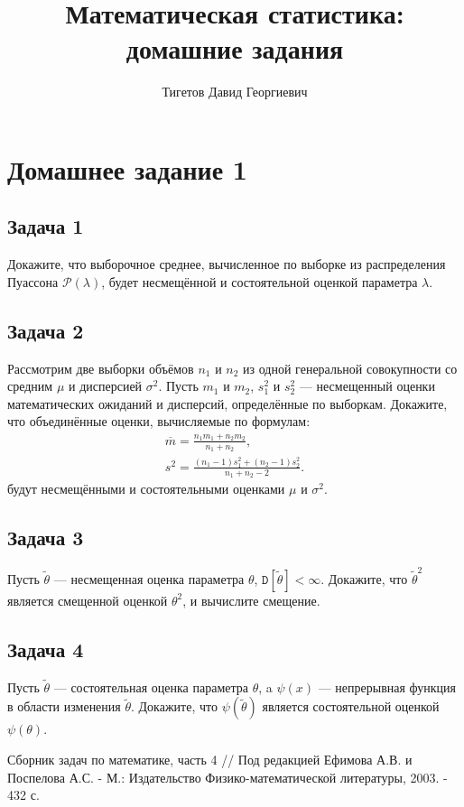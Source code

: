 \documentclass[a4paper,12pt]{article}
\newcommand{\variance}[1]{\mathtt{D} \left[ #1 \right]}
\begin{document}
\title{Математическая статистика: домашние задания}
\author{Тигетов Давид Георгиевич}
\maketitle

\section*{Домашнее задание 1}

\subsection*{Задача 1 \cite[108]{Efimov}}

Докажите, что выборочное среднее, вычисленное по выборке из распределения Пуассона $\mathcal{P}(\lambda)$, будет несмещённой и состоятельной оценкой
параметра $\lambda$.

\subsection*{Задача 2 \cite[103]{Efimov}}

Рассмотрим две выборки объёмов $n_1$ и $n_2$ из одной генеральной совокупности со средним $\mu$ и дисперсией $\sigma^2$.
Пусть $m_1$ и $m_2$, $s_1^2$ и $s_2^2$ --- несмещенный оценки математических ожиданий и дисперсий, определённые по выборкам. Докажите, что
объединённые оценки, вычисляемые по формулам:
\begin{gather*}
    \overline{m} = \frac{n_1 m_1 + n_2 m_2}{n_1 + n_2} , \\
    s^2 = \frac{(n_1 - 1) s_1^2 + (n_2 - 1) s_2^2}{n_1 + n_2 - 2} .
\end{gather*}
будут несмещёнными и состоятельными оценками $\mu$ и $\sigma^2$.

\subsection*{Задача 3 \cite[107]{Efimov}}

Пусть $\widetilde{\theta}$ --- несмещенная оценка параметра $\theta$, $\variance{\widetilde{\theta}} < \infty$. Докажите, что
$\widetilde{\theta}^2$ является смещенной оценкой $\theta^2$, и вычислите смещение.

\subsection*{Задача 4 \cite[110]{Efimov}}

Пусть $\widetilde{\theta}$ --- состоятельная оценка параметра $\theta$, a $\psi(x)$ --- непрерывная функция в области изменения $\widetilde{\theta}$.
Докажите, что $\psi(\widetilde{\theta})$ является состоятельной оценкой $\psi(\theta)$.

\begin{thebibliography}{1}
     Сборник задач по математике, часть 4 // Под редакцией Ефимова А.В. и Поспелова А.С. - М.: Издательство Физико-математической
    литературы, 2003. - 432 с.
\end{thebibliography}
\end{document}
